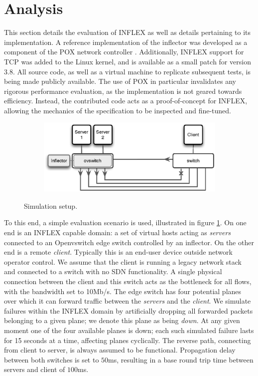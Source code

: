 \section{Analysis}
\label{section:eval}

This section details the evaluation of INFLEX as well as details pertaining to its implementation.
A reference implementation of the inflector was developed as a component of the POX network controller \cite{pox}.
Additionally, INFLEX support for \ac{TCP} was added to the Linux kernel, and is available as a small patch for version 3.8.
All source code, as well as a virtual machine to replicate subsequent tests, is being made publicly available.
The use of POX in particular invalidates any rigorous performance evaluation, as the implementation is not geared towards efficiency.
Instead, the contributed code acts as a proof-of-concept for INFLEX, allowing the mechanics of the specification to be inspected and fine-tuned.

\begin{figure}
    \begin{subfigure}[b]{1.0\linewidth}
        \centering
        \includegraphics[width=4.0in]{figures/inflex/simtopo.eps}
    \end{subfigure}%
    \caption{Simulation setup. \label{fig:simtopo}}
\end{figure}

To this end, a simple evaluation scenario is used, illustrated in figure \ref{fig:simtopo}.
On one end is an INFLEX capable domain: a set of virtual hosts acting as \emph{servers} connected to an Openvswitch edge switch controlled by an inflector.
On the other end is a remote \emph{client}.
Typically this is an end-user device outside network operator control. We assume that the client is running a legacy network stack and connected to a switch with no \ac{SDN} functionality.
A single physical connection between the client and this switch acts as the bottleneck for all flows, with the bandwidth set to 10Mb/s. The edge switch has four potential planes over which it can forward traffic between the \emph{servers} and the \emph{client}. We simulate failures within the INFLEX domain by artificially dropping all forwarded packets belonging to a given plane; we denote this plane as being \emph{down}. At any given moment one of the four available planes is down; each such simulated failure lasts for 15 seconds at a time, affecting planes cyclically.
The reverse path, connecting from client to server, is always assumed to be functional.
Propagation delay between both switches is set to $50$ms, resulting in a base round trip time between servers and client of $100$ms.

